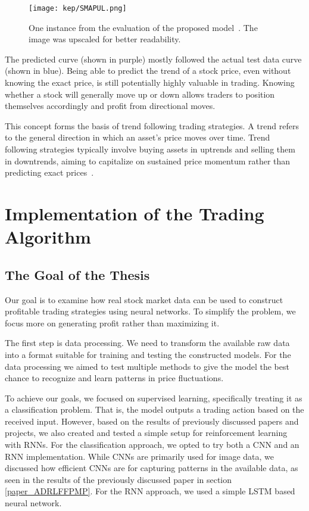 \documentclass[a4paper,oneside,onecolumn,12pt]{book}
\begin{document}
	\begin{figure}[H]
	\begin{center}
		\texttt{[image: kep/SMAPUL.png]}
		\caption{One instance from the evaluation of the proposed model~\cite{LiYuXuLiuMo2023}. The image was upscaled for better readability.}
		\label{fig:evalutaion_SMAPUL}
	\end{center}
	\end{figure}
	The predicted curve (shown in purple) mostly followed the actual test data curve (shown in blue). Being able to predict the trend of a stock price, even without knowing the exact price, is still potentially highly valuable in trading. Knowing whether a stock will generally move up or down allows traders to position themselves accordingly and profit from directional moves.

	This concept forms the basis of trend following trading strategies. A trend refers to the general direction in which an asset's price moves over time. Trend following strategies typically involve buying assets in uptrends and selling them in downtrends, aiming to capitalize on sustained price momentum rather than predicting exact prices~\cite{TFTSS}.

\chapter{Implementation of the Trading Algorithm}

\section{The Goal of the Thesis}
	Our goal is to examine how real stock market data can be used to construct profitable trading strategies using neural networks. To simplify the problem, we focus more on generating profit rather than maximizing it.

	The first step is data processing. We need to transform the available raw data into a format suitable for training and testing the constructed models. For the data processing we aimed to test multiple methods to give the model the best chance to recognize and learn patterns in price fluctuations.

	To achieve our goals, we focused on supervised learning, specifically treating it as a classification problem. That is, the model outputs a trading action based on the received input. However, based on the results of previously discussed papers and projects, we also created and tested a simple setup for reinforcement learning with RNNs. For the classification approach, we opted to try both a CNN and an RNN implementation. While CNNs are primarily used for image data, we discussed how efficient CNNs are for capturing patterns in the available data, as seen in the results of the previously discussed paper in section \ref{paper_ADRLFFPMP}. For the RNN approach, we used a simple LSTM based neural network.
\end{document}
